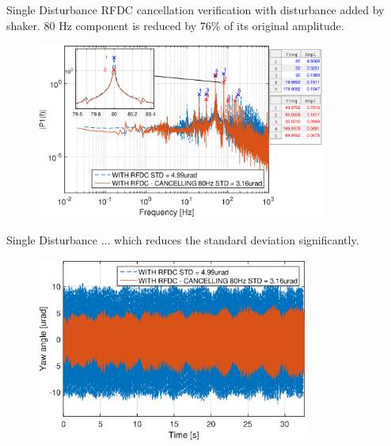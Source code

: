 \documentclass[10pt]{beamer}
\begin{document}
\begin{frame}{Single Disturbance}
  RFDC cancellation verification with disturbance added by shaker.
  80 Hz component is reduced by 76\% of its original amplitude.
  \begin{figure}[h!]
    \centering %
    \includegraphics[width=0.85\textwidth]{../fig/matlab/fft_closedloop_ext_disturbance_80Hz_with_zoom_2}
  \end{figure}
\end{frame}

\begin{frame}{Single Disturbance}
  ... which reduces the standard deviation significantly.
  \begin{figure}[h!]
    \centering %
    \includegraphics[width=0.8\textwidth, trim=0cm 0cm 0cm 0.7cm, clip=true]{../fig/matlab/yl_closedloop_ext_disturbance_80Hz_2}
  \end{figure}
\end{frame}
\end{document}
